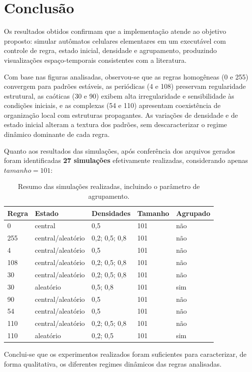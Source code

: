 \chapter{Conclusão}
\label{chap_conclusao}

Os resultados obtidos confirmam que a implementação atende ao objetivo proposto: simular autômatos celulares elementares em um executável com controle de regra, estado inicial, densidade e agrupamento, produzindo visualizações espaço-temporais consistentes com a literatura.

Com base nas figuras analisadas, observou-se que as regras homogêneas (0 e 255) convergem para padrões estáveis, as periódicas (4 e 108) preservam regularidade estrutural, as caóticas (30 e 90) exibem alta irregularidade e sensibilidade às condições iniciais, e as complexas (54 e 110) apresentam coexistência de organização local com estruturas propagantes. As variações de densidade e de estado inicial alteram a textura dos padrões, sem descaracterizar o regime dinâmico dominante de cada regra.

Quanto aos resultados das simulações, após conferência dos arquivos gerados foram identificadas \textbf{27 simulações} efetivamente realizadas, considerando apenas \(tamanho=101\):

\begin{table}[H]
\centering
\caption{Resumo das simulações realizadas, incluindo o parâmetro de agrupamento.}
\label{tab:resumo-completo-simulacoes}
\begin{tabular}{lllll}
\toprule
Regra & Estado & Densidades & Tamanho & Agrupado \\
\midrule
0 & central & 0,5 & 101 & não \\
255 & central/aleatório & 0,2; 0,5; 0,8 & 101 & não \\
4 & central/aleatório & 0,5 & 101 & não \\
108 & central/aleatório & 0,2; 0,5; 0,8 & 101 & não \\
30 & central/aleatório & 0,2; 0,5; 0,8 & 101 & não \\
30 & aleatório & 0,5; 0,8 & 101 & sim \\
90 & central/aleatório & 0,5 & 101 & não \\
54 & central/aleatório & 0,5 & 101 & não \\
110 & central/aleatório & 0,2; 0,5; 0,8 & 101 & não \\
110 & aleatório & 0,2; 0,5 & 101 & sim \\
\bottomrule
\end{tabular}
\end{table}

Conclui-se que os experimentos realizados foram suficientes para caracterizar, de forma qualitativa, os diferentes regimes dinâmicos das regras analisadas.
